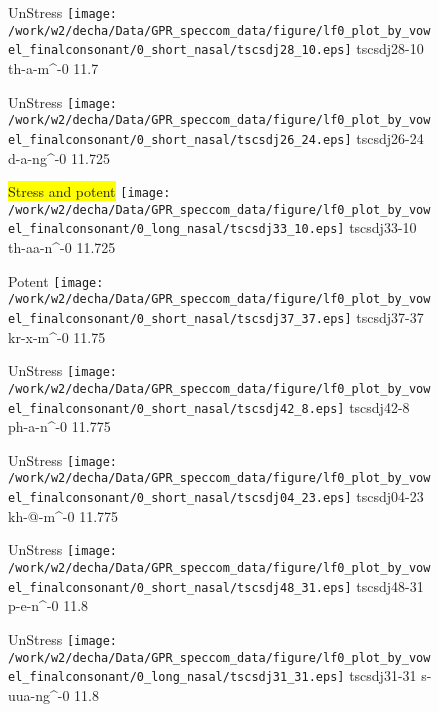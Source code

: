 \documentclass{article}
\begin{document}
\begin{figure}[t]
\begin{minipage}[b]{.24\textwidth}
UnStress
\centering
\texttt{[image: /work/w2/decha/Data/GPR\_speccom\_data/figure/lf0\_plot\_by\_vowel\_finalconsonant/0\_short\_nasal/tscsdj28\_10.eps]}
tscsdj28-10 th-a-m\textasciicircum-0 11.7
\end{minipage}
\begin{minipage}[b]{.24\textwidth}
UnStress
\centering
\texttt{[image: /work/w2/decha/Data/GPR\_speccom\_data/figure/lf0\_plot\_by\_vowel\_finalconsonant/0\_short\_nasal/tscsdj26\_24.eps]}
tscsdj26-24 d-a-ng\textasciicircum-0 11.725
\end{minipage}
\begin{minipage}[b]{.24\textwidth}
\colorbox{yellow}{Stress and potent}
\centering
\texttt{[image: /work/w2/decha/Data/GPR\_speccom\_data/figure/lf0\_plot\_by\_vowel\_finalconsonant/0\_long\_nasal/tscsdj33\_10.eps]}
tscsdj33-10 th-aa-n\textasciicircum-0 11.725
\end{minipage}
\begin{minipage}[b]{.24\textwidth}
\colorbox{Apricot}{Potent}
\centering
\texttt{[image: /work/w2/decha/Data/GPR\_speccom\_data/figure/lf0\_plot\_by\_vowel\_finalconsonant/0\_short\_nasal/tscsdj37\_37.eps]}
tscsdj37-37 kr-x-m\textasciicircum-0 11.75
\end{minipage}
\end{figure}
\clearpage
\begin{figure}[t]
\begin{minipage}[b]{.24\textwidth}
UnStress
\centering
\texttt{[image: /work/w2/decha/Data/GPR\_speccom\_data/figure/lf0\_plot\_by\_vowel\_finalconsonant/0\_short\_nasal/tscsdj42\_8.eps]}
tscsdj42-8 ph-a-n\textasciicircum-0 11.775
\end{minipage}
\begin{minipage}[b]{.24\textwidth}
UnStress
\centering
\texttt{[image: /work/w2/decha/Data/GPR\_speccom\_data/figure/lf0\_plot\_by\_vowel\_finalconsonant/0\_short\_nasal/tscsdj04\_23.eps]}
tscsdj04-23 kh-@-m\textasciicircum-0 11.775
\end{minipage}
\begin{minipage}[b]{.24\textwidth}
UnStress
\centering
\texttt{[image: /work/w2/decha/Data/GPR\_speccom\_data/figure/lf0\_plot\_by\_vowel\_finalconsonant/0\_short\_nasal/tscsdj48\_31.eps]}
tscsdj48-31 p-e-n\textasciicircum-0 11.8
\end{minipage}
\begin{minipage}[b]{.24\textwidth}
UnStress
\centering
\texttt{[image: /work/w2/decha/Data/GPR\_speccom\_data/figure/lf0\_plot\_by\_vowel\_finalconsonant/0\_long\_nasal/tscsdj31\_31.eps]}
tscsdj31-31 s-uua-ng\textasciicircum-0 11.8
\end{minipage}
\end{figure}
\end{document}
